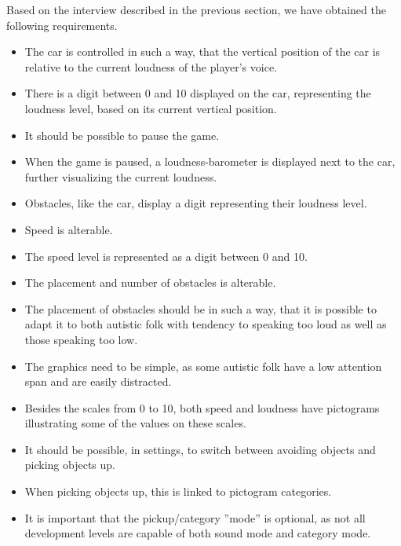 Based on the interview described in the previous section, we have obtained the following requirements.

\begin{itemize}
\item The car is controlled in such a way, that the vertical position of the car is relative to the current loudness of the player's voice.
\item There is a digit between 0 and 10 displayed on the car, representing the loudness level, based on its current vertical position.
\item It should be possible to pause the game.
\item When the game is paused, a loudness-barometer is displayed next to the car, further visualizing the current loudness.
\item Obstacles, like the car, display a digit representing their loudness level.
\item Speed is alterable.
\item The speed level is represented as a digit between 0 and 10.
\item The placement and number of obstacles is alterable.
\item The placement of obstacles should be in such a way, that it is possible to adapt it to both autistic folk with tendency to speaking too loud as well as those speaking too low.
\item The graphics need to be simple, as some autistic folk have a low attention span and are easily distracted.
\item Besides the scales from 0 to 10, both speed and loudness have pictograms illustrating some of the values on these scales.
\item It should be possible, in settings, to switch between avoiding objects and picking objects up.
\item When picking objects up, this is linked to pictogram categories.
\item It is important that the pickup/category ''mode'' is optional, as not all development levels are capable of both sound mode and category mode.
\end{itemize}